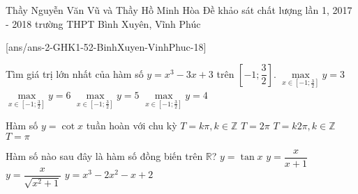\begin{name}
{Thầy Nguyễn Văn Vũ và Thầy Hồ Minh Hòa}
{Đề khảo sát chất lượng lần 1, 2017 - 2018 trường THPT Bình Xuyên, Vĩnh Phúc}
\end{name}
\setcounter{ex}{0}
[ans/ans-2-GHK1-52-BinhXuyen-VinhPhuc-18]
\begin{ex}%
Tìm giá trị lớn nhất của hàm số $y=x^3-3x+3$ trên $\left[-1;\dfrac{3}{2}\right]$.
\choice
{$\max \limits_{x \in \left[  - 1;\frac{3}{2} \right]} y = 3$}
{$\max \limits_{x \in \left[  - 1;\frac{3}{2} \right]} y=6$}
{\True $\max \limits_{x \in \left[  - 1;\frac{3}{2} \right]} y=5$}
{$\max \limits_{x \in \left[  - 1;\frac{3}{2} \right]} y=4$}
\end{ex}
\begin{ex}%
Hàm số $y=\cot x$ tuần hoàn với chu kỳ
\choice
{$T=k\pi, k\in \mathbb{Z} $}
{$T=2\pi $}
{$T=k2\pi, k\in \mathbb{Z}$}
{\True $T=\pi $}
\end{ex}
\begin{ex}%
Hàm số nào sau đây là hàm số đồng biến trên $\mathbb{R}$?
\choice
{$y=\tan x$}
{$y=\dfrac{x}{x+1}$}
{\True $y=\dfrac{x}{\sqrt{x^2+1}}$}
{$y=x^3-2x^2-x+2$}
\end{ex}

